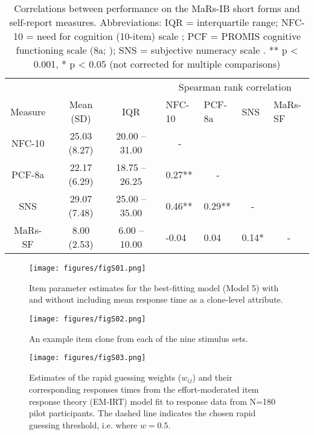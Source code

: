 \documentclass[a4paper,man,natbib]{apa6}
\begin{document}
\begin{table}
\centering
\begin{tabular*}{\textwidth}{ccccccllll}
\toprule
 & & & & & & \multicolumn{4}{c}{Spearman rank correlation} \\
\cmidrule(lr){7-10}
Measure & & Mean (SD) & & IQR & &  NFC-10 & PCF-8a & SNS & MaRs-SF \\
\midrule
NFC-10 & & 25.03 (8.27) & & 20.00 -- 31.00 & & \multicolumn{1}{c}{-} &  &  & \\
PCF-8a   &  & 22.17 (6.29) & & 18.75 -- 26.25 & & 0.27** &  \multicolumn{1}{c}{-} &  &  \\
SNS   &  & 29.07 (7.48) & & 25.00 -- 35.00 & & 0.46** &  0.29** &  \multicolumn{1}{c}{-} &   \\
MaRs-SF & &   8.00 (2.53) & &   6.00 -- 10.00 & & -0.04 &  0.04 &  0.14* &  \multicolumn{1}{c}{-} \\
\bottomrule
\end{tabular*}
\captionsetup{width=1.\textwidth}
\caption{\normalfont Correlations between performance on the MaRs-IB short forms and self-report measures. Abbreviations: IQR = interquartile range; NFC-10 = need for cognition (10-item) scale \citep{chiesi2018applying}; PCF = PROMIS cognitive functioning scale (8a; \citealt{iverson2021normative}); SNS = subjective numeracy scale \citep{fagerlin2007measuring}. ** p < 0.001,  * p < 0.05 (not corrected for multiple comparisons)}
\end{table}

\begin{figure}
\centering
\texttt{[image: figures/figS01.png]}
\caption{\label{fig:figS01} Item parameter estimates for the best-fitting model (Model 5) with and without including mean response time as a clone-level attribute.}
\end{figure}

\begin{figure}
\centering
\texttt{[image: figures/figS02.png]}
\caption{\label{fig:figS02} An example item clone from each of the nine stimulus sets.}
\end{figure}

\begin{figure}
\centering
\texttt{[image: figures/figS03.png]}
\caption{\label{fig:figS03} Estimates of the rapid guessing weights ($w_{ij}$) and their corresponding responses times from the effort-moderated item response theory (EM-IRT) model fit to response data from N=180 pilot participants. The dashed line indicates the chosen rapid guessing threshold, i.e. where $w = 0.5$.}
\end{figure}
\end{document}
